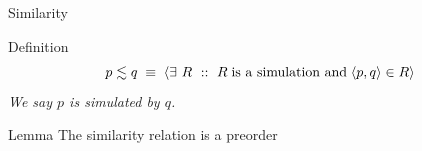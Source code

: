 \documentclass[aspectratio=169]{beamer}
\begin{document}
\exerciseAdd


\begin{slide}{Similarity}
\small

\begin{block}{Definition}
\centering
\[p \lesssim q\; \equiv\; \rcb{\exists}{R}{}{R\; \text{is a simulation and}\; \pair{p,q} \in R} 
\]
\emph{We say \alert{$p$ is simulated by $q$}.}
\end{block}


\begin{block}{Lemma}
The similarity relation is a preorder\\
\end{block}
\end{slide}
\end{document}
